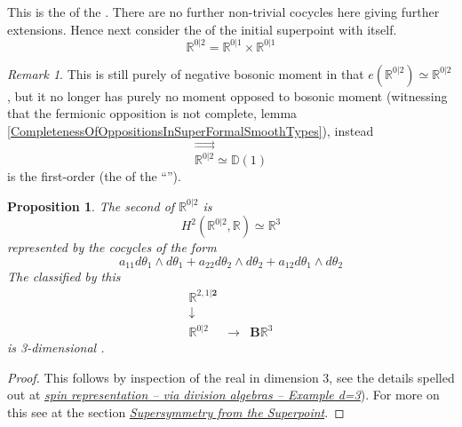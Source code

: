 \documentclass[12pt,titlepage]{article}
\newcommand{\itexarray}[1]{\begin{matrix}#1\end{matrix}}
\theoremstyle{plain}
\newtheorem{prop}{Proposition}
\theoremstyle{definition}
\theoremstyle{remark}
\newtheorem{remark}{Remark}
\begin{document}
This is the  of the .
There are no further non-trivial cocycles here giving further extensions.
Hence next consider the  of the initial superpoint with itself.
\begin{displaymath}
\mathbb{R}^{0|2}
=
\mathbb{R}^{0|1}\times \mathbb{R}^{0|1}
\end{displaymath}
\begin{remark}
\label{}\hypertarget{}{}
This is still purely of negative bosonic moment in that $e(\mathbb{R}^{0|2}) \simeq \mathbb{R}^{0|2}$, but it no longer has purely no moment opposed to bosonic moment (witnessing that the fermionic opposition is not complete, lemma \ref{CompletenessOfOppositionsInSuperFormalSmoothTypes}), instead
\begin{displaymath}
\stackrel{\rightrightarrows}{\mathbb{R}^{0|2}}
\simeq
\mathbb{D}(1)
\end{displaymath}
is the first-order  (the  of the ``'').
\end{remark}
\begin{prop}
\label{3dSuperMinkowskiSpacetime}\hypertarget{3dSuperMinkowskiSpacetime}{}
The second   of $\mathbb{R}^{0\vert 2}$ is
\begin{displaymath}
H^2(\mathbb{R}^{0\vert 2}, \mathbb{R})
\simeq
\mathbb{R}^3
\end{displaymath}
represented by the cocycles of the form
\begin{displaymath}
a_{11}

d\theta_1 \wedge d\theta_1
+
a_{22}

d\theta_2 \wedge d\theta_2
+
a_{12}

d\theta_1 \wedge d\theta_2
\end{displaymath}
The  classified by this
\begin{displaymath}
\itexarray{
\mathbb{R}^{2,1|\mathbf{2}}
\\
\downarrow
\\
\mathbb{R}^{0|2}
&\stackrel{}{\longrightarrow}&
\mathbf{B} \mathbb{R}^3
}
\end{displaymath}
is 3-dimensional .
\end{prop}
\begin{proof}
This follows by inspection of the real  in dimension 3, see the details spelled out at \emph{\href{http://ncatlab.org/nlab/show/spin%20representation#RealSpinorRepsIn3d}{spin representation -- via division algebras -- Example d=3}}).
For more on this see at  the section \emph{\href{https://ncatlab.org/nlab/show/geometry+of+physics+--+supersymmetry#SupersymmetryFromTheSuperpoint}{Supersymmetry from the Superpoint}}.
\end{proof}
\end{document}
